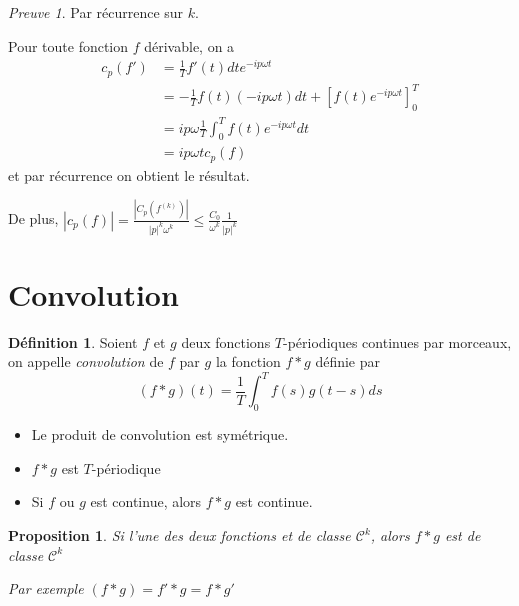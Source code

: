 \documentclass[]{article}
\newtheorem{myproposition}{Proposition}
\theoremstyle{remark}
\newtheorem{myproof}{Preuve}
\theoremstyle{definition}
\newtheorem{mydef}{Définition}
\begin{document}
\begin{myproof}
	Par récurrence sur $k$.
	
	Pour toute fonction $f$ dérivable, on a $$\begin{aligned}
	c_p(f') &= \frac{1}{T} f'(t) dt e^{-i p \omega t} \\
	&=-\frac{1}{T} f(t)(-i p \omega t) dt + \left[f(t) e^{-i p \omega t}\right]_0^T \\
	&=i p \omega \frac{1}{T} \int_0^T f(t) e^{-i p \omega t} dt \\
	&= i p \omega t c_p(f)
	\end{aligned}$$
	et par récurrence on obtient le résultat.
	
	De plus, $\displaystyle |c_p(f)| = \frac{|C_p(f^{(k)})|}{|p|^k \omega^k} \leqslant \frac{C_0}{\omega^k} \frac{1}{|p|^k}$
\end{myproof}

\section{Convolution}

\begin{mydef}
	Soient $f$ et $g$ deux fonctions $T$-périodiques continues par morceaux, on appelle \textit{convolution} de $f$ par $g$ la fonction $f * g$ définie par $$(f * g)(t) = \frac{1}{T} \int_{0}^{T} f(s)g(t - s)ds$$
	
	\begin{itemize}
		\item Le produit de convolution est symétrique.
		\item $f * g$ est $T$-périodique
		\item Si $f$ ou $g$ est continue, alors $f * g$ est continue.
	\end{itemize}
\end{mydef}

\begin{myproposition}
	Si l'une des deux fonctions et de classe $\mathcal{C}^k$, alors $f * g$ est de classe $\mathcal{C}^k$
	
	Par exemple $(f * g) = f' * g = f * g'$
\end{myproposition}
\end{document}
